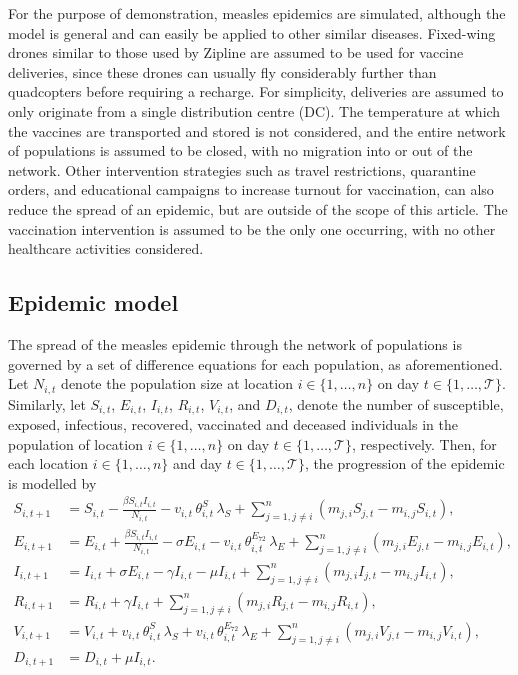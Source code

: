 \documentclass[10pt,letterpaper]{article}
\begin{document}
For the purpose of demonstration, measles epidemics are simulated, although the model is general and can easily be applied to other similar diseases. Fixed-wing drones similar to those used by Zipline are assumed to be used for vaccine deliveries, since these drones can usually fly considerably further than quadcopters before requiring a recharge. For simplicity, deliveries are assumed to only originate from a single distribution centre (DC). The temperature at which the vaccines are transported and stored is not considered, and the entire network of populations is assumed to be closed, with no migration into or out of the network. Other intervention strategies such as travel restrictions, quarantine orders, and educational campaigns to increase turnout for vaccination, can also reduce the spread of an epidemic, but are outside of the scope of this article. The vaccination intervention is assumed to be the only one occurring, with no other healthcare activities considered.

\subsection*{Epidemic model}
The spread of the measles epidemic through the network of populations is governed by a set of difference equations for each population, as aforementioned. Let $N_{i,t}$ denote the population size at location $i \in \{1,\dots,n \}$ on day $t \in \{1,\dots, \mathcal{T} \}$. Similarly, let $S_{i,t}$, $E_{i,t}$, $I_{i,t}$, $R_{i,t}$, $V_{i,t}$, and $D_{i,t}$, denote the number of susceptible, exposed, infectious, recovered, vaccinated and deceased individuals in the population of location $i \in \{1,\dots,n \}$ on day $t \in \{1,\dots, \mathcal{T} \}$, respectively. Then, for each location $i \in \{1, \dots, n\}$ and day $t \in \{1, \dots,\mathcal{T}\}$, the progression of the epidemic is modelled by 
\begin{align}
\label{Eqn:SEIRVD_model_start}
S_{i,t+1} &= S_{i,t} - \frac{\beta S_{i,t} I_{i,t}}{N_{i,t}} - v_{i,t} \, \theta^{S}_{i,t} \, \lambda_{S} + \sum_{j=1, j \neq i}^{n} (m_{j,i} S_{j,t} - m_{i,j} S_{i,t}),       \\
E_{i,t+1} &= E_{i,t} + \frac{\beta S_{i,t} I_{i,t}}{N_{i,t}} - \sigma E_{i,t} -  v_{i,t} \, \theta^{E_{72}}_{i,t} \, \lambda_{E} + \sum_{j=1, j \neq i}^{n} (m_{j,i} E_{j,t} - m_{i,j} E_{i,t}), \\
I_{i,t+1} &= I_{i,t} + \sigma E_{i,t} - \gamma I_{i,t} - \mu I_{i,t} + \sum_{j=1, j \neq i}^{n} (m_{j,i} I_{j,t} - m_{i,j} I_{i,t}),   \\
R_{i,t+1} &= R_{i,t} + \gamma I_{i,t} + \sum_{j=1, j \neq i}^{n} (m_{j,i} R_{j,t} - m_{i,j} R_{i,t}),  \\
V_{i,t+1} &= V_{i,t} + v_{i,t} \, \theta^{S}_{i,t} \, \lambda_{S} + v_{i,t} \, \theta^{E_{72}}_{i,t} \, \lambda_{E} + \sum_{j=1, j \neq i}^{n} (m_{j,i} V_{j,t} - m_{i,j} V_{i,t}), \\
\label{Eqn:SEIRVD_model_end}
D_{i,t+1} &= D_{i,t} + \mu I_{i,t}.
\end{align}
\end{document}
